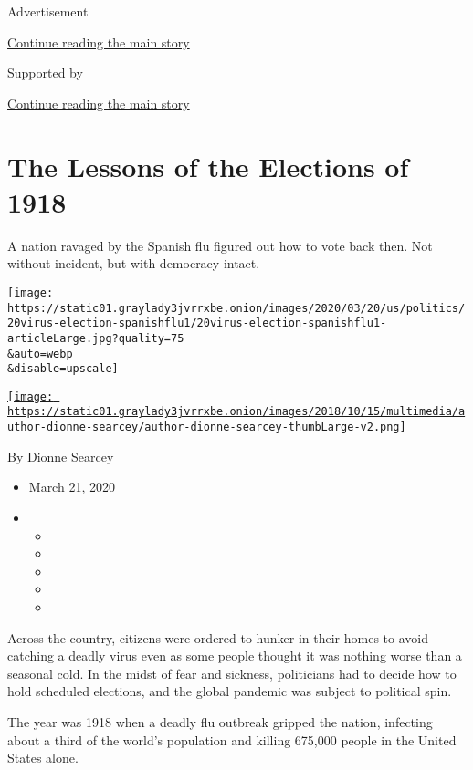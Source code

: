 Advertisement

\protect\hyperlink{after-top}{Continue reading the main story}

Supported by

\protect\hyperlink{after-sponsor}{Continue reading the main story}

\hypertarget{the-lessons-of-the-elections-of-1918}{%
\section{The Lessons of the Elections of
1918}\label{the-lessons-of-the-elections-of-1918}}

A nation ravaged by the Spanish flu figured out how to vote back then.
Not without incident, but with democracy intact.

\texttt{[image: https://static01.graylady3jvrrxbe.onion/images/2020/03/20/us/politics/20virus-election-spanishflu1/20virus-election-spanishflu1-articleLarge.jpg?quality=75\\\&auto=webp\\\&disable=upscale]}

\href{https://www.nytimes3xbfgragh.onion/by/dionne-searcey}{\texttt{[image: https://static01.graylady3jvrrxbe.onion/images/2018/10/15/multimedia/author-dionne-searcey/author-dionne-searcey-thumbLarge-v2.png]}}

By \href{https://www.nytimes3xbfgragh.onion/by/dionne-searcey}{Dionne
Searcey}

\begin{itemize}
\item
  March 21, 2020
\item
  \begin{itemize}
  \item
  \item
  \item
  \item
  \item
  \end{itemize}
\end{itemize}

Across the country, citizens were ordered to hunker in their homes to
avoid catching a deadly virus even as some people thought it was nothing
worse than a seasonal cold. In the midst of fear and sickness,
politicians had to decide how to hold scheduled elections, and the
global pandemic was subject to political spin.

The year was 1918 when a deadly flu outbreak gripped the nation,
infecting about a third of the world's population and killing 675,000
people in the United States alone.

